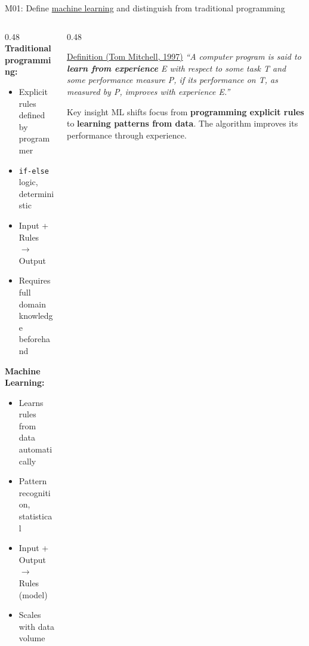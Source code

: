 \documentclass[aspectratio=169, 10pt]{beamer}
\begin{document}
\begin{frame}{M01: Define \href{https://en.wikipedia.org/wiki/Machine_learning}{machine learning} and distinguish from traditional programming}

    \begin{columns}
        \begin{column}{0.48\textwidth}
            \textbf{Traditional programming:}
            \begin{itemize}
                \item Explicit rules defined by programmer
                \item \texttt{if-else} logic, deterministic
                \item Input + Rules $\rightarrow$ Output
                \item Requires full domain knowledge beforehand
            \end{itemize}

            \vspace{2mm}
            \textbf{Machine Learning:}
            \begin{itemize}
                \item Learns rules from data automatically
                \item Pattern recognition, statistical
                \item Input + Output $\rightarrow$ Rules (model)
                \item Scales with data volume
            \end{itemize}
        \end{column}

        \begin{column}{0.48\textwidth}
            \begin{block}{\scriptsize \href{https://www.cs.cmu.edu/~tom/mlbook.html}{Definition (Tom Mitchell, 1997)}}
                \scriptsize
                \textit{``A computer program is said to \textbf{\textit{learn from experience}} E with respect to some task T and some performance measure P, if its performance on T, as measured by P, improves with experience E.''}
            \end{block}

            \begin{block}{\scriptsize Key insight}
                \scriptsize
                ML shifts focus from \textbf{programming explicit rules} to \textbf{learning patterns from data}. The algorithm improves its performance through experience.
            \end{block}
        \end{column}
    \end{columns}

\end{frame}
\end{document}

